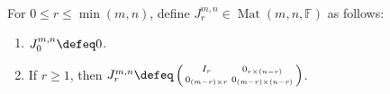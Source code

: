 \begin{definition} \label{def:matrix-rank-normal-form} \\
For $0\leq r\leq\min(m,n)$, define $J_r^{m,n}\in\operatorname{Mat}(m,n,\mathbb{F})$ as follows:
\begin{enumerate}[label=(\roman*)]
\setlength{\itemsep}{0pt}
\item $J_0^{m,n}\defeq0$.
\item If $r\geq1$, then $J_r^{m,n}\defeq\left(\begin{smallmatrix}I_r&0_{r\times(n-r)}\\0_{(m-r)\times r}&0_{(m-r)\times(n-r)}\end{smallmatrix}\right)$.
\end{enumerate}
\end{definition}

